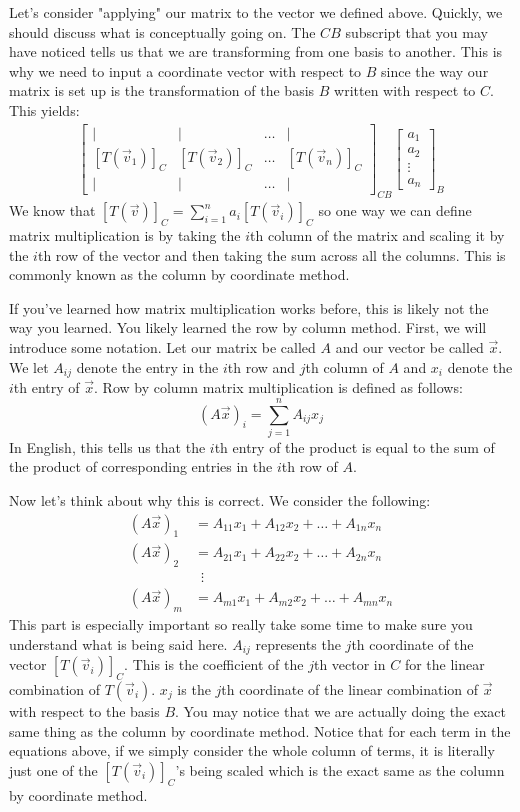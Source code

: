 Let's consider "applying" our matrix to the vector we defined above. Quickly, we should discuss what is conceptually going on. The $CB$ subscript that you may have noticed tells us that we are transforming from one basis to another. This is why we need to input a coordinate vector with respect to $B$ since the way our matrix is set up is the transformation of the basis $B$ written with respect to $C$. This yields:
\begin{align*}
    \begin{bmatrix}
    \vert & \vert & \ldots & \vert \\
    [T(\vec{v}_1)]_C & [T(\vec{v}_2)]_C & \ldots & [T(\vec{v}_n)]_C \\
    \vert & \vert & \ldots & \vert
\end{bmatrix}_{CB}\begin{bmatrix}
    a_1 \\ a_2 \\ \vdots \\ a_n
\end{bmatrix}_B
\end{align*}
We know that $[T(\vec{v})]_C=\sum_{i=1}^n a_i[T(\vec{v}_i)]_C$ so one way we can define matrix multiplication is by taking the $i$th column of the matrix and scaling it by the $i$th row of the vector and then taking the sum across all the columns. This is commonly known as the column by coordinate method. 

If you've learned how matrix multiplication works before, this is likely not the way you learned. You likely learned the row by column method. First, we will introduce some notation. Let our matrix be called $A$ and our vector be called $\vec{x}$. We let $A_{ij}$ denote the entry in the $i$th row and $j$th column of $A$ and $x_i$ denote the $i$th entry of $\vec{x}$. Row by column matrix multiplication is defined as follows:
$$(A\vec{x})_{i}=\sum_{j=1}^n A_{ij}x_j$$
In English, this tells us that the $i$th entry of the product is equal to the sum of the product of corresponding entries in the $i$th row of $A$.

Now let's think about why this is correct. We consider the following:
\begin{align*}
    (A\vec{x})_1&=A_{11}x_1+A_{12}x_2+\ldots+A_{1n}x_n\\
    (A\vec{x})_2&=A_{21}x_1+A_{22}x_2+\ldots+A_{2n}x_n\\
    &\,\,\,\vdots\\
    (A\vec{x})_m&=A_{m1}x_1+A_{m2}x_2+\ldots+A_{mn}x_n
\end{align*}
This part is especially important so really take some time to make sure you understand what is being said here. $A_{ij}$ represents the $j$th coordinate of the vector $[T(\vec{v}_i)]_C$. This is the coefficient of the $j$th vector in $C$ for the linear combination of $T(\vec{v}_i)$. $x_j$ is the $j$th coordinate of the linear combination of $\vec{x}$ with respect to the basis $B$. You may notice that we are actually doing the exact same thing as the column by coordinate method. Notice that for each term in the equations above, if we simply consider the whole column of terms, it is literally just one of the $[T(\vec{v}_i)]_C$'s being scaled which is the exact same as the column by coordinate method. 

